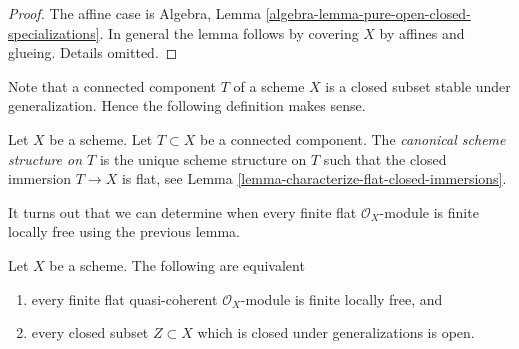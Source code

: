 \begin{proof}
The affine case is
Algebra, Lemma \ref{algebra-lemma-pure-open-closed-specializations}.
In general the lemma follows by covering $X$ by affines and glueing.
Details omitted.
\end{proof}

\noindent
Note that a connected component $T$ of a scheme $X$ is a closed
subset stable under generalization. Hence the following definition
makes sense.

\begin{definition}
\label{definition-scheme-structure-connected-component}
Let $X$ be a scheme. Let $T \subset X$ be a connected component.
The {\it canonical scheme structure on $T$} is the unique
scheme structure on $T$ such that the closed immersion $T \to X$
is flat, see
Lemma \ref{lemma-characterize-flat-closed-immersions}.
\end{definition}

\noindent
It turns out that we can determine when every finite flat
$\mathcal{O}_X$-module is finite locally free using the previous lemma.

\begin{lemma}
\label{lemma-finite-flat-is-finite-locally-free}
Let $X$ be a scheme. The following are equivalent
\begin{enumerate}
\item every finite flat quasi-coherent $\mathcal{O}_X$-module is
finite locally free, and
\item every closed subset $Z \subset X$ which is closed under generalizations
is open.
\end{enumerate}
\end{lemma}

